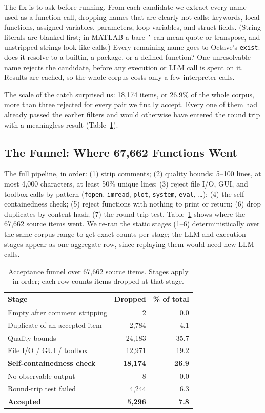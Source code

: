\documentclass[conference]{IEEEtran}
\newcommand{\FunnelTotal}{67{,}662}        %
\newcommand{\NAccepted}{5{,}296}           %
\begin{document}
The fix is to ask before running. From each candidate we extract every name used as a function call, dropping names that are clearly not calls: keywords, local functions, assigned variables, parameters, loop variables, and struct fields. (String literals are blanked first; in MATLAB a bare \texttt{'} can mean quote or transpose, and unstripped strings look like calls.) Every remaining name goes to Octave's \texttt{exist}: does it resolve to a builtin, a package, or a defined function? One unresolvable name rejects the candidate, before any execution or LLM call is spent on it. Results are cached, so the whole corpus costs only a few interpreter calls.

The scale of the catch surprised us: 18{,}174 items, or 26.9\% of the whole corpus, more than three rejected for every pair we finally accept. Every one of them had already passed the earlier filters and would otherwise have entered the round trip with a meaningless result (Table~\ref{tab:funnel}).

\subsection{The Funnel: Where 67,662 Functions Went}
\label{sec:funnel}
The full pipeline, in order:
(1) strip comments;
(2) quality bounds: 5--100 lines, at most 4{,}000 characters, at least 50\% unique lines;
(3) reject file I/O, GUI, and toolbox calls by pattern (\texttt{fopen}, \texttt{imread}, \texttt{plot}, \texttt{system}, \texttt{eval}, \dots);
(4) the self-containedness check;
(5) reject functions with nothing to print or return;
(6) drop duplicates by content hash;
(7) the round-trip test.
Table~\ref{tab:funnel} shows where the \FunnelTotal{} source items went. We re-ran the static stages (1--6) deterministically over the same corpus range to get exact counts per stage; the LLM and execution stages appear as one aggregate row, since replaying them would need new LLM calls.

\begin{table}[t]
\centering
\caption{Acceptance funnel over \FunnelTotal{} source items. Stages apply in order; each row counts items dropped at that stage.}
\label{tab:funnel}
\begin{tabular}{lrr}
\toprule
Stage & Dropped & \% of total \\
\midrule
Empty after comment stripping        & 2       & 0.0 \\
Duplicate of an accepted item        & 2{,}784  & 4.1 \\
Quality bounds                       & 24{,}183 & 35.7 \\
File I/O / GUI / toolbox             & 12{,}971 & 19.2 \\
\textbf{Self-containedness check}    & \textbf{18{,}174} & \textbf{26.9} \\
No observable output                 & 8       & 0.0 \\
Round-trip test failed               & 4{,}244  & 6.3 \\
\midrule
\textbf{Accepted}                    & \textbf{\NAccepted} & \textbf{7.8} \\
\bottomrule
\end{tabular}
\end{table}
\end{document}
